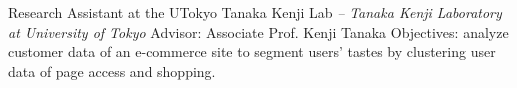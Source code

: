 \documentclass[letterpaper,MMMyyyy,nonstop]{simpleresumecv}
\begin{document}
\begin{body}
\BigGapNoBreak

Research Assistant at the UTokyo Tanaka Kenji Lab
\hfill
\textit{ -- }
\newline
\textit{Tanaka Kenji Laboratory at University of Tokyo}
\newline
Advisor: Associate Prof. Kenji Tanaka
\newline
Objectives: analyze customer data of an e-commerce site to segment users' tastes by clustering
user data of page access and shopping.

%
%
%
%
%
%


\end{body}
\end{document}
